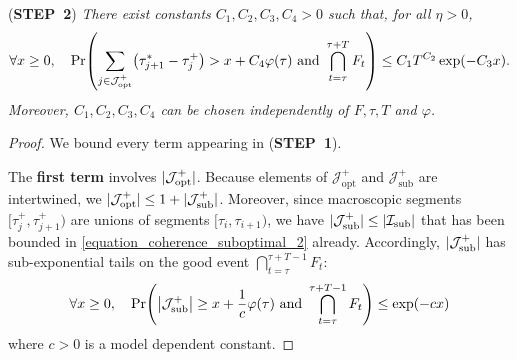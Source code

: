 \documentclass[preprint,cleveref,12pt]{colt2025}
\DeclarePairedDelimiter{\parens}{(}{)}	%
\DeclarePairedDelimiter{\abs}{\lvert}{\rvert}	%
\def\STEP#1{(\strong{STEP~#1})}
\newcommand{\strong}[1]{\textbf{#1}}
\begin{document}
    \noindent
    \STEP{2}
    \textit{
        There exist constants $C_1, C_2, C_3, C_4 > 0$ such that, for all $\eta > 0$, 
        \begin{equation}
            \forall x \ge 0,
            \quad
            \Pr \parens*{
                \sum_{j \in \mathcal{J}^+_\mathrm{opt}} \parens*{\tau_{j+1}^* - \tau_j^+} 
                >
                x + C_4 \varphi(\tau)
                \text{~and~}
                \bigcap_{t = \tau}^{\tau+T} F_t
            }
            \le 
            C_1 T^{C_2} \exp(-C_3x).
        \end{equation}
        Moreover, $C_1, C_2, C_3, C_4$ can be chosen independently of $F, \tau, T$ and $\varphi$. 
    }
    \medskip
    \begin{proof}
        We bound every term appearing in \STEP{1}.

        The \strong{first term} involves $\abs{\mathcal{J}^+_\mathrm{opt}}$.
        Because elements of $\mathcal{J}^+_\mathrm{opt}$ and $\mathcal{J}^+_\mathrm{sub}$ are intertwined, we $\abs{\mathcal{J}^+_\mathrm{opt}} \le 1 + \abs{\mathcal{J}^+_\mathrm{sub}}$. 
        Moreover, since macroscopic segments $[\tau_j^+, \tau_{j+1}^+)$ are unions of segments $[\tau_i, \tau_{i+1})$, we have $\abs{\mathcal{J}^+_\mathrm{sub}} \le \abs{\mathcal{I}_\mathrm{sub}}$ that has been bounded in \eqref{equation_coherence_suboptimal_2} already.
        Accordingly, $\abs{\mathcal{J}^+_\mathrm{sub}}$ has sub-exponential tails on the good event $\bigcap_{t=\tau}^{\tau+T-1} F_t$:
        \begin{equation}
            \forall x \ge 0,
            \quad
            \Pr \parens*{
                \abs*{\mathcal{J}^+_\mathrm{sub}} \ge x + \frac 1c \varphi(\tau)
                \text{~and~} \bigcap_{t=\tau}^{\tau+T-1} F_t
            }
            \le 
            \exp \parens*{- c x}
        \end{equation}
        where $c > 0$ is a model dependent constant.


\end{proof}
\end{document}
